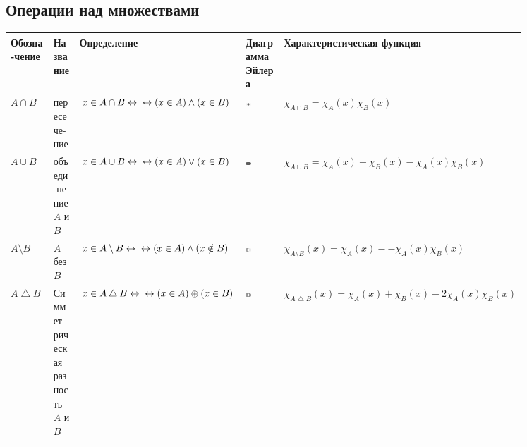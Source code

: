 \documentclass[12pt,oneside]{article}
\theoremstyle{definition}
\begin{document}
\subsection{Операции над множествами}
\begin{table}[H]
    \centering
    \begin{tabular}{p{0.1\linewidth}| p{0.1\linewidth}| p{0.25\linewidth}| p{0.2\linewidth}| p{0.2\linewidth}}
         Обозна-чение & Название & Определение & Диаграмма Эйлера &  Характеристическая функция \\\hline
         
         $A\cap B$ &
         пересече-ние & 
         $x\in A\cap B \leftrightarrow \newline \leftrightarrow (x\in A)\wedge (x\in B)$ &
         \includegraphics[width=0.2\textwidth]{intersect.eps}
         &
         $\chi_{A\cap B}=\chi_{A}(x)\chi_{B}(x)$ \\\hline
         
         $A\cup B$& объеди-нение\newline $A$ и $B$ &
         $x\in A\cup B \leftrightarrow \newline \leftrightarrow (x\in A)\vee (x\in B)$ &
         \includegraphics[width=0.2\textwidth]{union.eps}
         &
         $\chi_{A\cup B}=\chi_{A}(x)+\chi_{B}(x)-\chi_{A}(x)\chi_{B}(x)$ \\\hline
         
         $A\setminus B$ & 
         $A$ без $B$ & 
         $x\in A\setminus B \leftrightarrow \newline \leftrightarrow (x\in A)\wedge (x\notin B)$& 
         \includegraphics[width=0.2\textwidth]{setminus.eps}
         & 
         $\chi_{A\setminus B}(x)=\chi_{A}(x)--\chi_{A}(x)\chi_{B}(x)$\\\hline
         
         $A\bigtriangleup B$ &
         Симмет-рическая разность $A$ и $B$ &
         $x\in A\bigtriangleup B \leftrightarrow \newline \leftrightarrow (x\in A)\oplus(x\in B)$ 
         &
         \includegraphics[width=0.2\textwidth]{simdiff.eps}
         & $\chi_{A\bigtriangleup B}(x)= \chi_{A}(x) + \chi_{B}(x) - 2\chi_{A}(x)\chi_{B}(x)$ \\\hline
         

\end{tabular}
\end{table}
\end{document}

